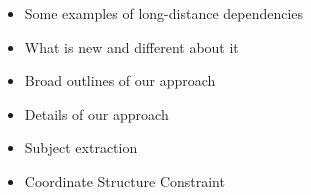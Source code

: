 \documentclass[a4paper,landscape,headrule,footrule]{foils}
\begin{document}
\avmfont{\it}

\maketitle


\begin{itemize}
\item Some examples of long-distance dependencies
\item What is new and different about it
\item Broad outlines of our approach
\item Details of our approach
\item Subject extraction
\item Coordinate Structure Constraint
\end{itemize}




\end{document}
